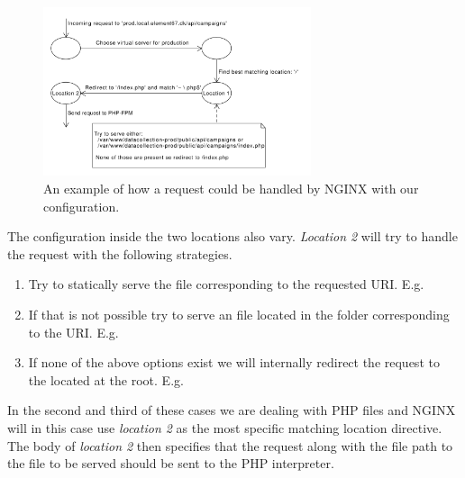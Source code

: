 \\
\begin{figure}[!htbp]
    \centering
    \includegraphics[width=0.7\textwidth]{graphic/architecture/NGINX_workflow.pdf}
    \caption{An example of how a request could be handled by NGINX with our configuration.}
    \label{fig:NGINX_workflow}
\end{figure}
\FloatBarrier

The configuration inside the two locations also vary. \emph{Location 2} will try to handle the request with the following strategies. 
\begin{enumerate}
	\item Try to statically serve the file corresponding to the requested URI. E.g.
	\\
	\item If that is not possible try to serve an  file located in the folder corresponding to the URI. E.g.
	\\
	\item If none of the above options exist we will internally redirect the request to the  located at the root. E.g.
	\\
\end{enumerate}

In the second and third of these cases we are dealing with PHP files and NGINX will in this case use \emph{location 2} as the most specific matching location directive. The body of \emph{location 2} then specifies that the request along with the file path to the file to be served should be sent to the PHP interpreter. 

